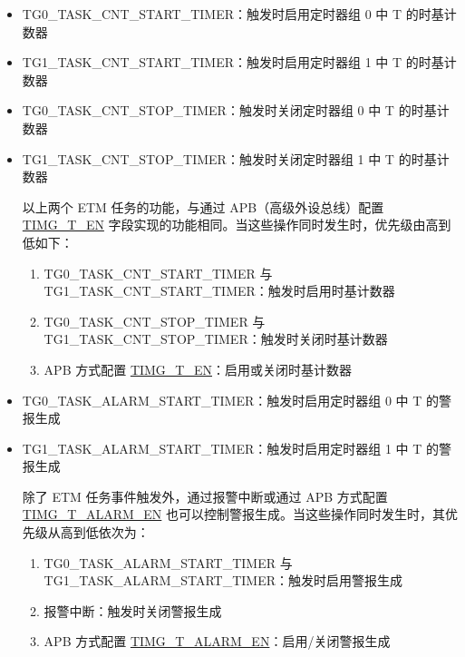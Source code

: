 \documentclass[main\_\_CN.tex]{subfiles}
\begin{document}
\begin{itemize}
\item TG0\_TASK\_CNT\_START\_TIMER：触发时启用定时器组 0 中 T 的时基计数器
\item TG1\_TASK\_CNT\_START\_TIMER：触发时启用定时器组 1 中 T 的时基计数器
\item TG0\_TASK\_CNT\_STOP\_TIMER：触发时关闭定时器组 0 中 T 的时基计数器
\item TG1\_TASK\_CNT\_STOP\_TIMER：触发时关闭定时器组 1 中 T 的时基计数器

\begin{tiplisting}
以上两个 ETM 任务的功能，与通过 APB（高级外设总线）配置 \hyperref[fielddesc:TIMGTXEN]{TIMG\_T\_EN} 字段实现的功能相同。当这些操作同时发生时，优先级由高到低如下：

\begin{enumerate}
    \item TG0\_TASK\_CNT\_START\_TIMER 与 TG1\_TASK\_CNT\_START\_TIMER：触发时启用时基计数器
    \item TG0\_TASK\_CNT\_STOP\_TIMER 与 TG1\_TASK\_CNT\_STOP\_TIMER：触发时关闭时基计数器
    \item APB 方式配置 \hyperref[fielddesc:TIMGTXEN]{TIMG\_T\_EN}：启用或关闭时基计数器
\end{enumerate}
\end{tiplisting}

\item TG0\_TASK\_ALARM\_START\_TIMER：触发时启用定时器组 0 中 T 的警报生成
\item TG1\_TASK\_ALARM\_START\_TIMER：触发时启用定时器组 1 中 T 的警报生成

\begin{tiplisting}
除了 ETM 任务事件触发外，通过报警中断或通过 APB 方式配置 \hyperref[fielddesc:TIMGTXALARMEN]{TIMG\_T\_ALARM\_EN} 也可以控制警报生成。当这些操作同时发生时，其优先级从高到低依次为：


\begin{enumerate}
    \item TG0\_TASK\_ALARM\_START\_TIMER 与 TG1\_TASK\_ALARM\_START\_TIMER：触发时启用警报生成
    \item 报警中断：触发时关闭警报生成
    \item APB 方式配置 \hyperref[fielddesc:TIMGTXALARMEN]{TIMG\_T\_ALARM\_EN}：启用/关闭警报生成
\end{enumerate}
\end{tiplisting}


\end{itemize}
\end{document}
